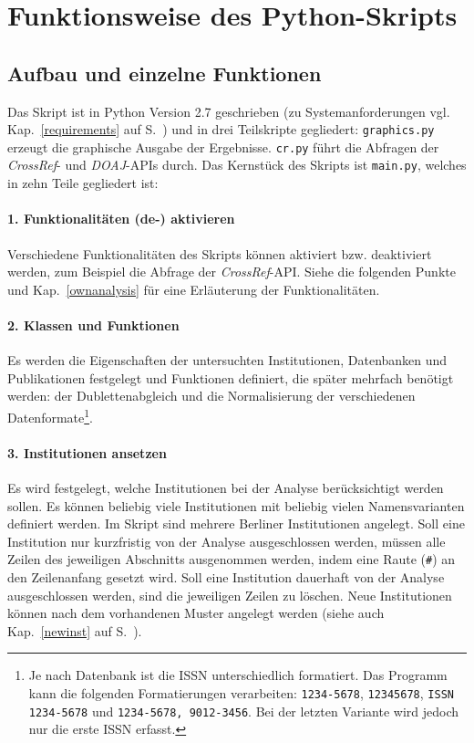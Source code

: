 \section{Funktionsweise des Python-Skripts}
\label{funktionsweise}
\subsection{Aufbau und einzelne Funktionen}
Das Skript ist in Python Version 2.7 geschrieben (zu Systemanforderungen vgl. Kap.~\ref{requirements} auf S.~\pageref{requirements}) und in drei Teilskripte gegliedert: \texttt{graphics.py} erzeugt die graphische Ausgabe der Ergebnisse. \texttt{cr.py} führt die Abfragen der \textit{CrossRef}- und \textit{DOAJ}-APIs durch. Das Kernstück des Skripts ist \texttt{main.py}, welches in zehn Teile gegliedert ist:

\paragraph{1. Funktionalitäten (de-) aktivieren}
Verschiedene Funktionalitäten des Skripts können aktiviert bzw. deaktiviert werden, zum Beispiel die Abfrage der \textit{CrossRef}-API. Siehe die folgenden Punkte und Kap.~\ref{ownanalysis} für eine Erläuterung der Funktionalitäten.

\paragraph{2. Klassen und Funktionen} \label{func-def}
Es werden die Eigenschaften der untersuchten Institutionen, Datenbanken und Publikationen festgelegt und Funktionen definiert, die später mehrfach benötigt werden: der Dublettenabgleich und die Normalisierung der verschiedenen Datenformate\footnote{Je nach Datenbank ist die ISSN unterschiedlich formatiert. Das Programm kann die folgenden Formatierungen verarbeiten: \texttt{1234-5678}, \texttt{12345678}, \texttt{ISSN 1234-5678} und \texttt{1234-5678, 9012-3456}. Bei der letzten Variante wird jedoch nur die erste ISSN erfasst.}.

\paragraph{3. Institutionen ansetzen} \label{inst-def}
Es wird festgelegt, welche Institutionen bei der Analyse berücksichtigt werden sollen. Es können beliebig viele Institutionen mit beliebig vielen Namensvarianten definiert werden. Im Skript sind mehrere Berliner Institutionen angelegt. Soll eine Institution nur kurzfristig von der Analyse ausgeschlossen werden, müssen alle Zeilen des jeweiligen Abschnitts ausgenommen werden, indem eine Raute (\texttt{\#}) an den Zeilenanfang gesetzt wird. Soll eine Institution dauerhaft von der Analyse ausgeschlossen werden, sind die jeweiligen Zeilen zu löschen. Neue Institutionen können nach dem vorhandenen Muster angelegt werden (siehe auch Kap.~\ref{newinst}  auf S.~\pageref{newinst}).

